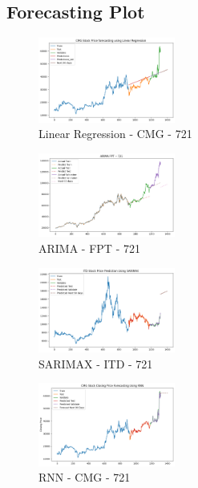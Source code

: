 \documentclass{ieeeojies}
\begin{document}
\subsection{Forecasting Plot}
\begin{figure} [H]
    \centering
    \includegraphics[width=0.4\textwidth]{bibliography/Figure/LinearRegression_CMG_721_90.png}
    \caption{Linear Regression - CMG - 721}
    \label{fig:LR_CMG_721_90}
\end{figure}
\begin{figure} [H]
    \centering
    \includegraphics[width=0.4\textwidth]{bibliography/Figure/ARIMA_FPT_721_90.png}
    \caption{ARIMA - FPT - 721}
    \label{fig:ARIMA_FPT_721_90}
\end{figure}
\begin{figure} [H]
    \centering
    \includegraphics[width=0.4\textwidth]{bibliography/Figure/SARIMAX_ITD_721_90.png}
    \caption{SARIMAX - ITD - 721}
    \label{fig:SARIMAX_ITD_721_90}
\end{figure}
\begin{figure} [H]
    \centering
    \includegraphics[width=0.4\textwidth]{bibliography/Figure/RNN_CMG_721_90.png}
    \caption{RNN - CMG - 721}
    \label{fig:RNN_CMG_721_90}
\end{figure}
\end{document}
